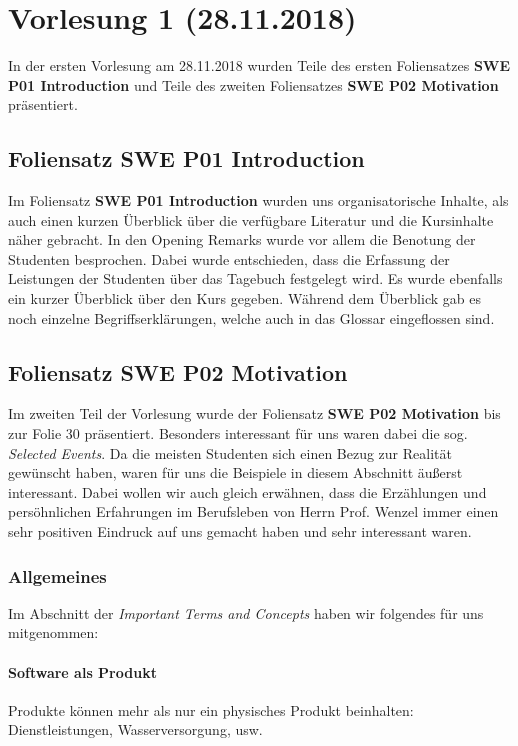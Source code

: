 \documentclass[a4paper,12pt,twoside]{scrreprt}
\begin{document}
\chapter{Vorlesung 1 (28.11.2018)}
In der ersten Vorlesung am 28.11.2018 wurden Teile des ersten Foliensatzes \textbf{SWE P01 Introduction} und Teile des zweiten Foliensatzes \textbf{SWE P02 Motivation} präsentiert. 
  \section{Foliensatz SWE P01 Introduction}
  Im Foliensatz \textbf{SWE P01 Introduction} wurden uns organisatorische Inhalte, als auch einen kurzen Überblick über die verfügbare Literatur und die Kursinhalte näher gebracht. 
  \newline
  In den Opening Remarks wurde vor allem die Benotung der Studenten besprochen. Dabei wurde entschieden, dass die Erfassung der Leistungen der Studenten über das Tagebuch festgelegt wird. 
  Es wurde ebenfalls ein kurzer Überblick über den Kurs gegeben. Während dem Überblick gab es noch einzelne Begriffserklärungen, welche auch in das Glossar eingeflossen sind. 

  \section{Foliensatz SWE P02 Motivation}
Im zweiten Teil der Vorlesung wurde der Foliensatz \textbf{SWE P02 Motivation} bis zur Folie 30 präsentiert. 
\newline
Besonders interessant für uns waren dabei die sog. \textit{Selected Events}. Da die meisten Studenten sich einen Bezug zur Realität gewünscht haben, waren für uns die Beispiele in diesem Abschnitt äußerst interessant. 
Dabei wollen wir auch gleich erwähnen, dass die Erzählungen und persöhnlichen Erfahrungen im Berufsleben von Herrn Prof. Wenzel immer einen sehr positiven Eindruck auf uns gemacht haben und sehr interessant waren. 

\subsection{Allgemeines}
Im Abschnitt der \textit{Important Terms and Concepts} haben wir folgendes für uns mitgenommen:

\subsubsection{Software als Produkt}
Produkte können mehr als nur ein physisches Produkt beinhalten: Dienstleistungen, Wasserversorgung, usw. 
\end{document}
